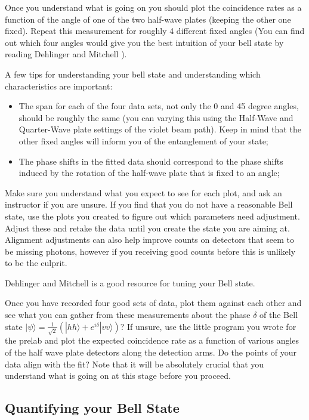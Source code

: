 \documentclass{../lab}
\begin{document}
Once you understand what is going on you should plot the coincidence rates  as a function of the angle of one of the two half-wave plates (keeping the other one fixed). Repeat this measurement for roughly 4 different fixed angles (You can find out which four angles would give you the best intuition of your bell state by reading Dehlinger and Mitchell \cite{Dehlinger}).

A few tips for understanding your bell state and understanding which characteristics are important:

\begin{itemize}
    \item The span for each of the four data sets, not only the 0 and 45 degree angles, should be roughly the same (you can varying this using the Half-Wave and Quarter-Wave plate settings of the violet beam path). Keep in mind that the other fixed angles will inform you of the entanglement of your state;

    \item The phase shifts in the fitted data should correspond to the phase shifts induced by the rotation of the half-wave plate that is fixed to an angle;
\end{itemize}

Make sure you understand what you expect to see for each plot, and ask an instructor if you are unsure. If you find that you do not have a reasonable Bell state, use the plots you created to figure out which parameters need adjustment. Adjust these and retake the data until you create the state you are aiming at. Alignment adjustments can also help improve counts on detectors that seem to be missing photons, however if you receiving good counts before this is unlikely to be the culprit.

Dehlinger and Mitchell \cite{Dehlinger} is a good resource for tuning your Bell state.

Once you have recorded four good sets of data, plot them against each other and see what you can gather from these measurements about the phase $\delta$ of the Bell state $|\psi \rangle = \frac{1}{\sqrt{2}} (|hh\rangle + e^{i\delta} |vv\rangle)$? If unsure, use the little program you wrote for the prelab and plot the expected coincidence rate as a function of various angles of the half wave plate detectors along the detection arms. Do the points of your data align with the fit? Note that it will be absolutely crucial that you understand what is going on at this stage before you proceed.

\subsection{Quantifying your Bell State}
\end{document}
